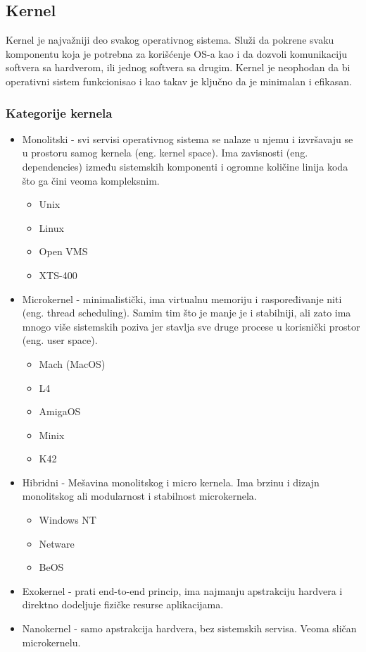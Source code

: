 \documentclass[a4paper,14pt]{article}
\begin{document}
\subsection{Kernel}
Kernel je najvažniji deo svakog operativnog sistema. Služi da pokrene svaku komponentu koja je potrebna za korišćenje OS-a kao i da dozvoli komunikaciju softvera sa hardverom, ili jednog softvera sa drugim. Kernel je neophodan da bi operativni sistem funkcionisao i kao takav je ključno da je minimalan i efikasan.

\subsubsection{Kategorije kernela}
\begin{itemize}
\item Monolitski - svi servisi operativnog sistema se nalaze u njemu i izvršavaju se u prostoru samog kernela (eng. kernel space). Ima zavisnosti (eng. dependencies) između sistemskih komponenti i ogromne količine linija koda što ga čini veoma kompleksnim.
\begin{itemize}
\item Unix
\item Linux
\item Open VMS
\item XTS-400
\end{itemize}
\item Microkernel - minimalistički, ima virtualnu memoriju i raspoređivanje niti (eng. thread scheduling). Samim tim što je manje je i stabilniji, ali zato ima mnogo više sistemskih poziva jer stavlja sve druge procese u korisnički prostor (eng. user space).
\begin{itemize}
\item Mach (MacOS)
\item L4
\item AmigaOS
\item Minix
\item K42
\end{itemize}
\item Hibridni - Mešavina monolitskog i micro kernela. Ima brzinu i dizajn monolitskog ali modularnost i stabilnost microkernela.
\begin{itemize}
\item Windows NT
\item Netware
\item BeOS
\end{itemize}
\item Exokernel - prati end-to-end princip, ima najmanju apstrakciju hardvera i direktno dodeljuje fizičke resurse aplikacijama.
\item Nanokernel - samo apstrakcija hardvera, bez sistemskih servisa. Veoma sličan microkernelu.
\end{itemize}
\newpage
\end{document}
